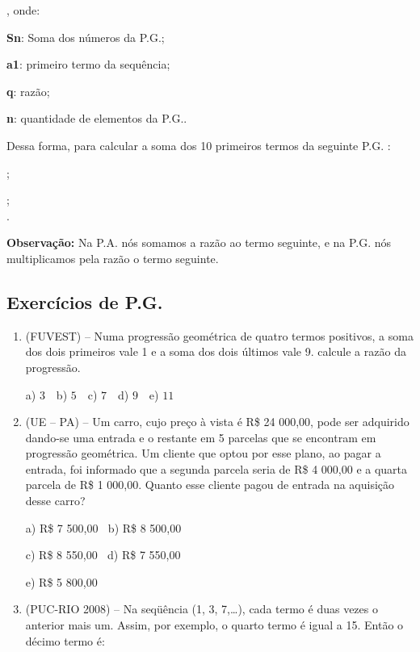 \begin{multicols*}{2}
, onde:

\textbf{Sn}: Soma dos números da P.G.;

\textbf{a1}: primeiro termo da sequência;

\textbf{q}: razão;

\textbf{n}: quantidade de elementos da P.G..

Dessa forma, para calcular a soma dos 10 primeiros termos da seguinte P.G. :

;

;\\

.

\textbf{Observação:} Na P.A. nós somamos a razão ao termo seguinte, e na P.G. nós multiplicamos pela razão o termo seguinte.

\subsection{Exercícios de P.G.}

\begin{enumerate}

\item  (FUVEST) – Numa progressão geométrica de quatro termos positivos, a soma dos dois primeiros vale 1 e a soma dos dois últimos vale 9. calcule a razão da progressão.

	a) $3 \ \ \ $ b) $5 \ \ \ $ c) $7 \ \ \ $ d) $9 \ \ \ $ e) $11$

\item (UE – PA) – Um carro, cujo preço à vista é R\$ 24 000,00, pode ser adquirido dando-se uma entrada e o restante em 5 parcelas que se encontram em progressão geométrica. Um cliente que optou por esse plano, ao pagar a entrada, foi informado que a segunda parcela seria de R\$ 4 000,00 e a quarta parcela de R\$ 1 000,00. Quanto esse cliente pagou de entrada na aquisição desse carro?

a) R\$ 7 500,00 $ \ $ b) R\$ 8 500,00

c) R\$ 8 550,00 $ \ $ d) R\$ 7 550,00

e) R\$ 5 800,00

\item  (PUC-RIO 2008) – Na seqüência (1, 3, 7,…), cada termo é duas vezes o anterior mais um. Assim, por exemplo, o quarto termo é igual a 15. Então o décimo termo é:


\end{enumerate}
\end{multicols*}
